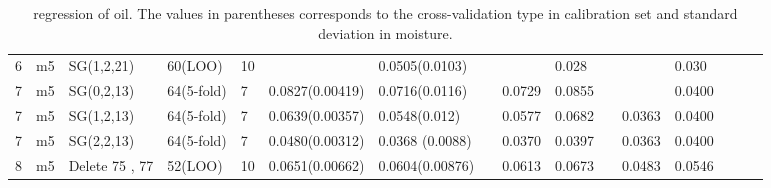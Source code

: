 \documentclass[a4paper,12pt,titlepage]{article} %
\numberwithin{equation}{section}  %
\begin{document}
\begin{landscape}
\begin{table}[]
\begin{tabular}{llllllllllllllll}
				6                    & m5                   & SG(1,2,21)           & 60(LOO)    & 10 &                 & 0.0505(0.0103)  &   &        & 0.028  &   &        & 0.030          &         &    &                 \\
				7                    & m5                   & SG(0,2,13)           & 64(5-fold) & 7  & 0.0827(0.00419) & 0.0716(0.0116)  &   & 0.0729 & 0.0855 &   &        & 0.0400         &         &    &                 \\
				7                    & m5                   & SG(1,2,13)           & 64(5-fold) & 7  & 0.0639(0.00357) & 0.0548(0.012)   &   & 0.0577 & 0.0682 &   & 0.0363 & 0.0400         &         &    &                 \\
				7                    & m5                   & SG(2,2,13)           & 64(5-fold) & 7  & 0.0480(0.00312) & 0.0368 (0.0088) &   & 0.0370 & 0.0397 &   & 0.0363 & 0.0400         &         &    &                 \\
				8                    & m5                   & Delete 75 , 77       & 52(LOO)    & 10 & 0.0651(0.00662) & 0.0604(0.00876) &   & 0.0613 & 0.0673 &   & 0.0483 & 0.0546         &         &    &                 
			\end{tabular}
			
			\caption{regression of oil. The values in parentheses corresponds to the cross-validation type in calibration set and standard deviation in moisture.}
			\label{tab:oil}
		\end{table}
	\end{landscape}
	
\end{document}
